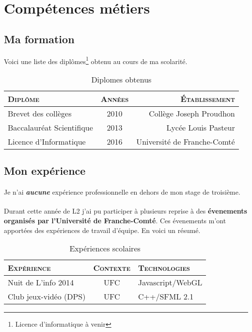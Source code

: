 \documentclass[a4paper,12pt, draft]{report}
\newcommand{\tabTitle}[1]{\hfill{} \textsc{#1} \hfill{} }
\begin{document}
\section{Compétences métiers}
\subsection{Ma formation}
Voici une liste des diplômes\footnote{Licence d'informatique à venir} obtenu au cours de ma scolarité.
\begin{table}[h]
\begin{center}
\begin{tabular}{|l|c|r|}
\hline
\tabTitle{Diplôme} & \tabTitle{Années} & \tabTitle{Établissement}\\
\hline
Brevet des collèges & 2010 & Collège Joseph Proudhon \\
\hline
Baccalauréat Scientifique & 2013 & Lycée Louis Pasteur \\
\hline
Licence d'Informatique & 2016 & Université de Franche-Comté\\
\hline
\end{tabular}
\end{center}
\caption{Diplomes obtenus} 
\end{table}

\subsection{Mon expérience}
\paragraph{}
Je n'ai \textit{\textbf{aucune}} expérience professionnelle en dehors de mon stage de troisième.

\paragraph{}
Durant cette année de L2 j'ai pu participer à plusieurs reprise à des \textbf{évenements organisés par l'Université de Franche-Comté}. Ces évenements m'ont apportées des expériences de travail d'équipe. En voici un résumé.

\begin{table}[h]
\begin{tabular}{|l|c|l|}
\hline
\tabTitle{Expérience}  &  \tabTitle{Contexte} & \tabTitle{Technologies}\\
\hline
Nuit de L'info 2014  & UFC & Javascript/WebGL\\
\hline
Club jeux-vidéo (DPS\footnotemark{})  & UFC & C++/SFML 2.1\\
\hline
\end{tabular}
\caption{Expériences scolaires}
\end{table}
\end{document}
